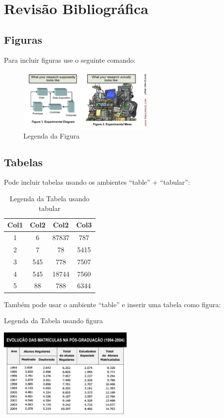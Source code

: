 \chapter{Revisão Bibliográfica}
\label{revisao_bibliografica}

\section{Figuras}

Para incluir figuras use o seguinte comando:

\begin{figure}[h]
\centering
\includegraphics[width=0.6\textwidth]{chapters/fig/research.jpg}
\caption{Legenda da Figura}
\label{label_figura}
\end{figure}

\section{Tabelas}

Pode incluir tabelas usando os ambientes ``table'' + ``tabular'':

\begin{table}[h]
\centering
\caption{Legenda da Tabela usando tabular}
\label{label_tabela_tabular}
\begin{tabular}{||c c c c||} 
\hline
Col1 & Col2 & Col2 & Col3 \\ 
\hline\hline
1 & 6 & 87837 & 787 \\ 
\hline
2 & 7 & 78 & 5415 \\ 
\hline
3 & 545 & 778 & 7507 \\ 
\hline
4 & 545 & 18744 & 7560 \\ 
\hline
5 & 88 & 788 & 6344 \\ 
\hline
\end{tabular}
\end{table}

Também pode usar o ambiente ``table'' e inserir uma tabela como figura:

\begin{table}[h]
\centering
\caption{Legenda da Tabela usando figura}
\label{label_tabela_figura}
\includegraphics[width=0.5\textwidth]{chapters/fig/tabela.jpg}
\label{label_figura}
\end{table}

